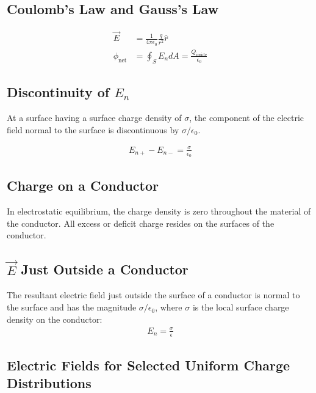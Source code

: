 \documentclass[../main.tex]{subfiles}
\begin{document}
\subsection{Coulomb's Law and Gauss's Law}
\label{sub:coulomb_s_law_and_gauss_s_law}

\begin{align}
  \vec{E} &= \frac{1}{4\pi \epsilon_0}\frac{q}{r^2}\hat{r}\\
  \phi_{\text{net}} &= \oint_{S}E_{n}dA = \frac{Q_{\text{inside}}}{\epsilon_0}
\end{align}

\subsection{Discontinuity of $E_n$}
\label{sub:discontinuity_of_e_n_}

At a surface having a surface charge density of $\sigma$, the component of the
electric field normal to the surface is discontinuous by $\sigma/\epsilon_0$.

\begin{align}
  E_{n+} - E_{n-} = \frac{\sigma}{\epsilon_0}
\end{align}

\subsection{Charge on a Conductor}
\label{sub:charge_on_a_conductor}

In electrostatic equilibrium, the charge density is zero throughout the
material of the conductor. All excess or deficit charge resides on the surfaces
of the conductor.

\subsection{$\vec{E}$ Just Outside a Conductor}
\label{sub:_e_just_outside_a_conductor}

The resultant electric field just outside the surface of a conductor is normal
to the surface and has the magnitude $\sigma/\epsilon_0$, where $\sigma$ is the
local surface charge density on the conductor:
\begin{align}
  E_n = \frac{\sigma}{\epsilon}
\end{align}

\subsection{Electric Fields for Selected Uniform Charge Distributions}
\label{sub:electric_fields_for_selected_uniform_charge_distributions}
\end{document}
